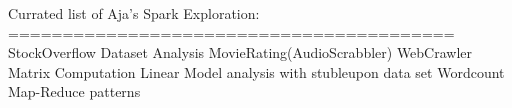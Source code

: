 Currated list of Aja's Spark Exploration:
=========================================
StockOverflow Dataset Analysis
MovieRating(AudioScrabbler)
WebCrawler
Matrix Computation
Linear Model analysis with stubleupon data set
Wordcount
Map-Reduce patterns